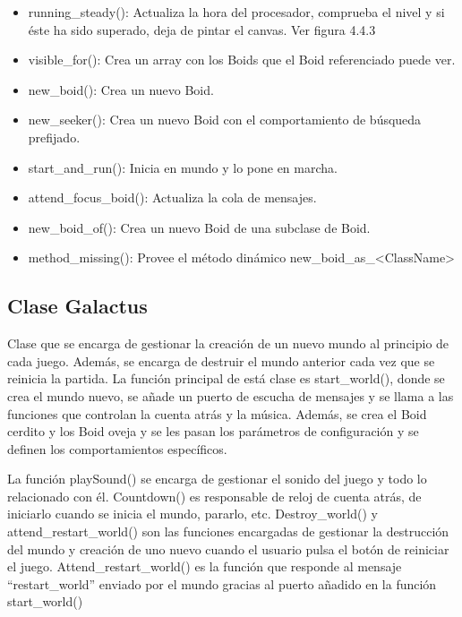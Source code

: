 \begin{itemize}
 \item running\_steady():
Actualiza la hora del procesador, comprueba el nivel y si éste ha sido superado, deja de pintar el canvas. Ver figura 4.4.3

 \item visible\_for():
Crea un array con los Boids que el Boid referenciado puede ver.

 \item new\_boid():
Crea un nuevo Boid.

 \item new\_seeker():
Crea un nuevo Boid con el comportamiento de búsqueda prefijado.

 \item start\_and\_run():
Inicia en mundo y lo pone en marcha.

 \item attend\_focus\_boid():
Actualiza la cola de mensajes.

 \item new\_boid\_of():
Crea un nuevo Boid de una subclase de Boid.

 \item method\_missing():
Provee el método dinámico new\_boid\_as\_<ClassName>
\end{itemize}



\subsection{Clase Galactus}
\label{subsection:galactus}

Clase que se encarga de gestionar la creación de un nuevo mundo al principio de cada juego. Además, se encarga de destruir el mundo 
anterior cada vez que se reinicia la partida. La función principal de está clase es start\_world(), donde se crea el mundo nuevo, se añade 
un puerto de escucha de mensajes y se llama a las funciones que controlan la cuenta atrás y la música. Además, se crea el Boid cerdito y 
los Boid oveja y se les pasan los parámetros de configuración y se definen los comportamientos específicos.

La función playSound() se encarga de gestionar el sonido del juego y todo lo relacionado con él. Countdown() es responsable de reloj de 
cuenta atrás, de iniciarlo cuando se inicia el mundo, pararlo, etc. Destroy\_world() y attend\_restart\_world() son las funciones encargadas 
de gestionar la destrucción del mundo y creación de uno nuevo cuando el usuario pulsa el botón de reiniciar el juego. 
Attend\_restart\_world() es la función que responde al mensaje “restart\_world” enviado por el mundo gracias al puerto añadido en la 
función start\_world()

